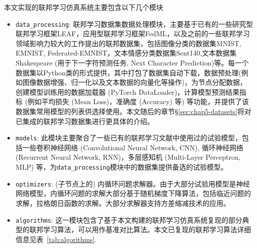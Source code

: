 本文实现的联邦学习仿真系统主要包含以下几个模块
\begin{itemize}
    \item \texttt{data\_processing}: 联邦学习数据集数据处理模块，主要基于已有的一些研究型联邦学习框架LEAF\cite{caldas2018_leaf}，应用型联邦学习框架FedML\cite{he_2020_fedml}，以及之前的一些联邦学习领域影响力较大的工作\cite{mcmahan2017fed_avg,sahu2018fedprox,reddi2020fed_opt}提出的联邦数据集，包括图像分类的数据集MNIST\cite{Lecun_1998_mnist}, EMNIST\cite{cohen2017emnist}, Federated-EMNIST\cite{caldas2018_leaf,sahu2018fedprox}，文本情感分类数据集Sent140\cite{sent140,caldas2018_leaf},文本数据集Shakespeare (用于下一字符预测任务, Next Character Prediction)\cite{mcmahan2017fed_avg,caldas2018_leaf}等。每一个数据集以Python类的形式提供，其中打包了数据集自动下载，数据预处理(例如图像数据增强、归一化以及文本数据的向量化等操作)，为节点分配数据，创建模型训练用的数据加载器 (PyTorch DataLoader)，计算模型预测结果指标 (例如平均损失 (Mean Loss)，准确度 (Accuracy) 等) 等功能，并提供了该数据集常用模型的列表供选择使用。本文随后的章节\S\ref{sec:chap5-datasets}将对已集成的联邦学习数据集进行更具体的介绍。
    \item \texttt{models}: 此模块主要聚合了一些已有的联邦学习文献\cite{mcmahan2017fed_avg,zhang2020fedpd,sahu2018fedprox,Ghosh_2022_cfl,he_2020_fedml}中使用过的试验模型，包括一些卷积神经网络 (Convolutional Neural Network, CNN), 循环神经网络 (Recurrent Neural Network, RNN)，多层感知机 (Multi-Layer Perceptron, MLP) 等，为\texttt{data\_processing}模块中的数据集提供备选的试验模型。
    \item \texttt{optimizers}: (子节点上的) 内循环问题求解器。由于大部分试验用模型是神经网络模型，内循环问题的求解大部分基于随机梯度下降算法，包括临近问题的求解，拉格朗日函数的求解。大部分求解器支持方差缩减技术的应用。
    \item \texttt{algorithms}: 这一模块包含了基于本文构建的联邦学习仿真系统复现的部分典型的联邦学习算法，可以用作基准对比算法。本文已复现的联邦学习算法详细信息见表~\ref{tab:algorithms}.
\end{itemize}



